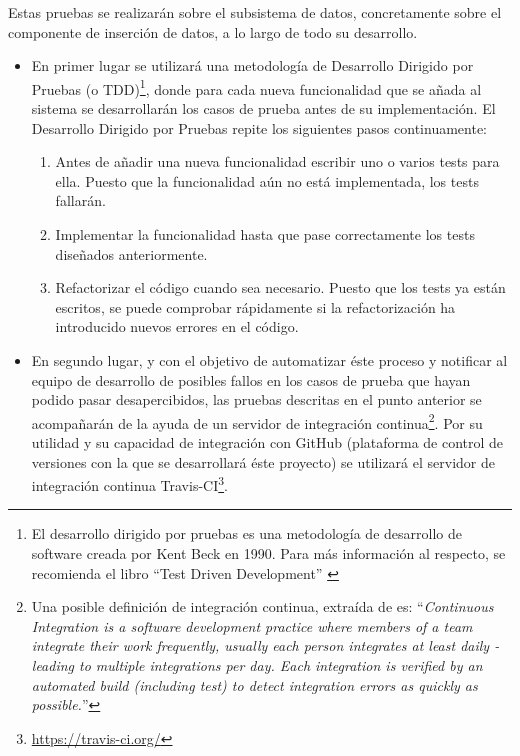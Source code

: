 Estas pruebas se realizarán sobre el subsistema de datos, concretamente sobre el componente de inserción de datos, a lo largo de todo su desarrollo.
\begin{itemize}
\item En primer lugar se utilizará una metodología de Desarrollo Dirigido por Pruebas (o TDD)\footnote{El desarrollo dirigido por pruebas es una metodología de desarrollo de software creada por Kent Beck en 1990.  Para más información al respecto, se recomienda el libro ``Test Driven Development'' \cite{kbeck:test-driven-development}}, donde para cada nueva funcionalidad que se añada al sistema se desarrollarán los casos de prueba antes de su implementación.  El Desarrollo Dirigido por Pruebas repite los siguientes pasos continuamente:
	\begin{enumerate}
		\item
			Antes de añadir una nueva funcionalidad escribir uno o varios tests para ella.  Puesto que la funcionalidad aún no está implementada, los tests fallarán.
		\item
			Implementar la funcionalidad hasta que pase correctamente los tests diseñados anteriormente.
		\item
			Refactorizar el código cuando sea necesario.  Puesto que los tests ya están escritos, se puede comprobar rápidamente si la refactorización ha introducido nuevos errores en el código.
	\end{enumerate}
\item En segundo lugar, y con el objetivo de automatizar éste proceso y notificar al equipo de desarrollo de posibles fallos en los casos de prueba que hayan podido pasar desapercibidos, las pruebas descritas en el punto anterior se acompañarán de la ayuda de un servidor de integración continua\footnote{Una posible definición de integración continua, extraída de \cite{mfowler:continuous-integration} es: ``\textit{Continuous Integration is a software development practice where members of a team integrate their work frequently, usually each person integrates at least daily - leading to multiple integrations per day. Each integration is verified by an automated build (including test) to detect integration errors as quickly as possible.}''}.  Por su utilidad y su capacidad de integración con GitHub (plataforma de control de versiones con la que se desarrollará éste proyecto) se utilizará el servidor de integración continua Travis-CI\footnote{\url{https://travis-ci.org/}}.
\end{itemize}


